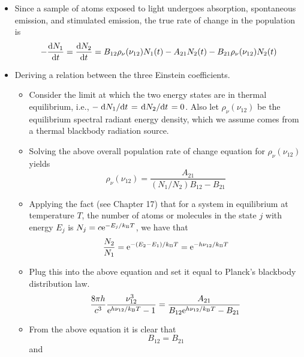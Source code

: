 \documentclass[../notes.tex]{subfiles}
\begin{document}
\begin{itemize}
\begin{itemize}
\begin{itemize}
        \end{itemize}
    \end{itemize}
    \item Since a sample of atoms exposed to light undergoes absorption, spontaneous emission, and stimulated emission, the true rate of change in the population is
    \begin{equation*}
        -\dv{N_1}{t} = \dv{N_2}{t} = B_{12}\rho_\nu(\nu_{12})N_1(t)-A_{21}N_2(t)-B_{21}\rho_\nu(\nu_{12})N_2(t)
    \end{equation*}
    \item Deriving a relation between the three Einstein coefficients.
    \begin{itemize}
        \item Consider the limit at which the two energy states are in thermal equilibrium, i.e., $-\dv*{N_1}{t}=\dv*{N_2}{t}=0$. Also let $\rho_\nu(\nu_{12})$ be the equilibrium spectral radiant energy density, which we assume comes from a thermal blackbody radiation source.
        \item Solving the above overall population rate of change equation for $\rho_\nu(\nu_{12})$ yields
        \begin{equation*}
            \rho_\nu(\nu_{12}) = \frac{A_{21}}{(N_1/N_2)B_{12}-B_{21}}
        \end{equation*}
        \item Applying the fact (see Chapter 17) that for a system in equilibrium at temperature $T$, the number of atoms or molecules in the state $j$ with energy $E_j$ is $N_j=c\e[-E_j/k_\text{B}T]$, we have that
        \begin{equation*}
            \frac{N_2}{N_1} = \e[-(E_2-E_1)/k_\text{B}T] = \e[-h\nu_{12}/k_\text{B}T]
        \end{equation*}
        \item Plug this into the above equation and set it equal to Planck's blackbody distribution law.
        \begin{equation*}
            \frac{8\pi h}{c^3}\frac{\nu_{12}^3}{\e[h\nu_{12}/k_\text{B}T]-1} = \frac{A_{21}}{B_{12}\e[h\nu_{12}/k_\text{B}T]-B_{21}}
        \end{equation*}
        \item From the above equation it is clear that
        \begin{equation*}
            B_{12} = B_{21}
        \end{equation*}
        and
        \begin{equation*}

\end{equation*}
\end{itemize}
\end{itemize}
\end{document}
